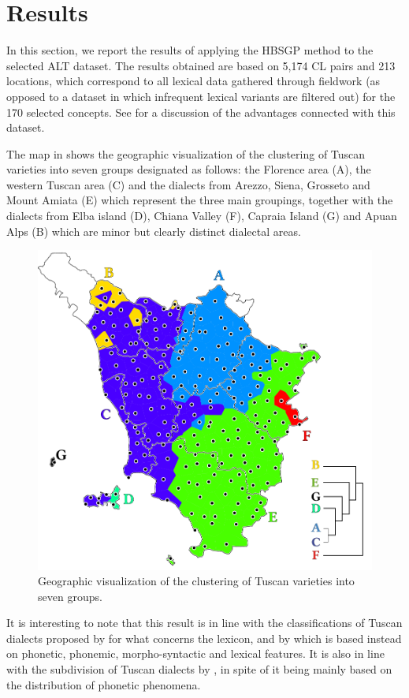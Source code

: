 \documentclass[output=paper]{LSP/langsci}
\begin{document}
\section{Results}
In this section, we report the results of applying the HBSGP method to the selected ALT dataset. The results obtained are based on 5,174 CL pairs and 213 locations, which correspond to all lexical data gathered through fieldwork (as opposed to a dataset in which infrequent lexical variants are filtered out) for the 170 selected concepts. See \citet{wieling_infrequent_2015} for a discussion of the advantages connected with this dataset. 

The map in  shows the geographic visualization of the clustering of Tuscan varieties into seven groups designated as follows: the Florence area (A), the western Tuscan area (C) and the dialects from Arezzo, Siena, Grosseto and Mount Amiata (E) which represent the three main groupings, together with the dialects from Elba island (D), Chiana Valley (F), Capraia Island (G) and Apuan Alps (B) which are minor but clearly distinct dialectal areas.

\begin{figure}
\includegraphics[width=.8\textwidth]{illustrations/monte_wiel_fig1_v2} 
\caption{Geographic visualization of the clustering of Tuscan varieties into seven groups.} 
\label{fig:1}
\end{figure}

It is interesting to note that this result is in line with the classifications of Tuscan dialects proposed by \citet{giacomelli_aree_1975} for what concerns the lexicon, and by \citet{giannelli_toscana_1976} which is based instead on phonetic, phonemic, morpho-syntactic and lexical features. It is also in line with the subdivision of Tuscan dialects by \citet{pellegrini_carta_1977}, in spite of it being mainly based on the distribution of phonetic phenomena.
\end{document}
